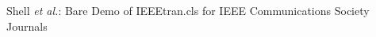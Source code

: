\documentclass[journal,comsoc]{IEEEtran}
\begin{document}
%
{Shell \MakeLowercase{\textit{et al.}}: Bare Demo of IEEEtran.cls for IEEE Communications Society Journals}
% 











\maketitle
\end{document}
